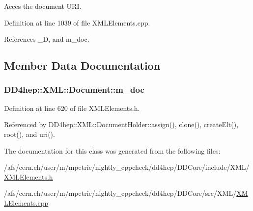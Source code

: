 Acces the document URI. 

Definition at line 1039 of file XMLElements.cpp.

References \_\-D, and m\_\-doc.

\subsection{Member Data Documentation}
\hypertarget{class_d_d4hep_1_1_x_m_l_1_1_document_a8fad6eeaaafe3a15002cb16fb0b325a3}{
\subsubsection[{m\_\-doc}]{ {\bf DD4hep::XML::Document::m\_\-doc}}}
\label{class_d_d4hep_1_1_x_m_l_1_1_document_a8fad6eeaaafe3a15002cb16fb0b325a3}


Definition at line 620 of file XMLElements.h.

Referenced by DD4hep::XML::DocumentHolder::assign(), clone(), createElt(), root(), and uri().

The documentation for this class was generated from the following files:\begin{DoxyCompactItemize}
\item 
/afs/cern.ch/user/m/mpetric/nightly\_\-cppcheck/dd4hep/DDCore/include/XML/\hyperlink{_x_m_l_elements_8h}{XMLElements.h}\item 
/afs/cern.ch/user/m/mpetric/nightly\_\-cppcheck/dd4hep/DDCore/src/XML/\hyperlink{_x_m_l_elements_8cpp}{XMLElements.cpp}\end{DoxyCompactItemize}

